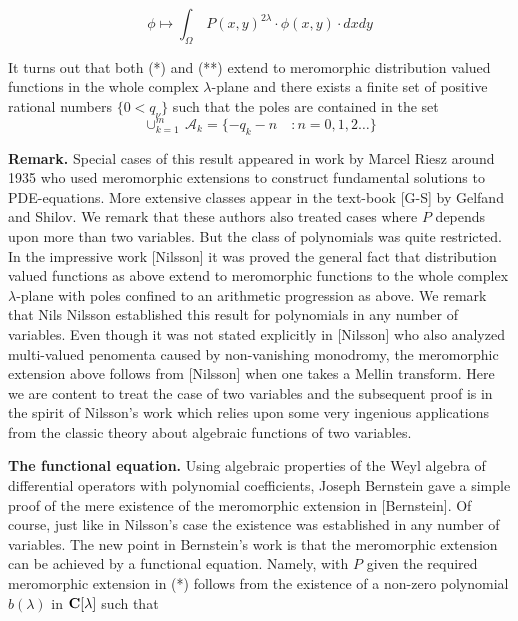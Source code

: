 \[
\phi\mapsto \int_\Omega\, P(x,y)^{2\lambda}\cdot\phi(x,y)\cdot dxdy\tag{**}
\]
\bigskip

\noindent
It turns out that both (*) and (**) extend to meromorphic
distribution valued functions in the whole complex
$\lambda$-plane and there exists a 
finite set of positive rational numbers
$\{ 0<q_\nu\}$
such that the poles are contained in the set
\[ 
\cup_{k=1}^m\, \mathcal A_k=\{-q_k-n\quad\colon n=0,1,2\ldots\}
\]
\medskip


\noindent
{\bf{Remark.}}
Special cases of this result appeared  in
work by Marcel Riesz around 1935 who used meromorphic extensions to construct
fundamental solutions to PDE-equations.
More extensive classes appear in the text-book 
[G-S] by Gelfand and Shilov. We remark that these authors also treated 
cases where $P$ depends upon more than 
two variables. But  the class of polynomials was
quite restricted. 
In the impressive work [Nilsson] it was proved 
the general fact that
distribution valued functions as above extend to meromorphic functions
to the whole complex $\lambda$-plane with poles confined to
an arithmetic progression as above. We remark that Nils Nilsson 
established this result for polynomials in any number of variables.
Even though it was not stated
explicitly
in [Nilsson] who also analyzed multi-valued penomenta caused by
non-vanishing monodromy, the meromorphic extension above 
follows from [Nilsson] when one takes a
Mellin transform.
Here we are content to treat the case of two variables and the
subsequent proof is in the spirit of
Nilsson's work which relies upon some very ingenious applications from the classic
theory about 
algebraic functions of two variables.
\medskip

\noindent
{\bf{The  functional equation.}}
Using algebraic properties of  the Weyl algebra 
of differential operators with polynomial coefficients, Joseph Bernstein gave
a  simple proof 
of the mere existence of the meromorphic
extension in [Bernstein]. Of course, just like  in Nilsson's
case the existence was established in any number of variables.
The new  point in  Bernstein's work  
is that the meromorphic
extension can be  achieved by a functional equation. Namely, with
$P$ given the required meromorphic extension in
(*) follows from the existence of a non-zero polynomial $b(\lambda)$ in
${\bf{C}}[\lambda]$ such that


